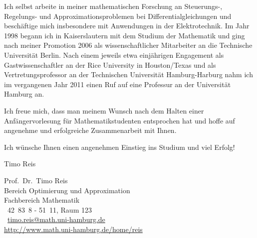 Ich selbst arbeite in meiner mathematischen Forschung an Steuerungs-,\linebreak
Regelungs- und Approximationsproblemen bei Differentialgleichungen und
besch\"aftige mich insbesondere mit Anwendungen in der Elektrotechnik. Im Jahr
1998 begann ich in Kaiserslautern mit dem Studium der Mathematik und ging nach
meiner Promotion 2006 als wissenschaftlicher Mitarbeiter an die Technische
Universit\"at Berlin. Nach einem jeweils etwa einj\"ahrigen Engagement als
Gastwissenschaftler an der Rice University in Houston/Texas und als
Vertretungsprofessor an der Technischen Universit\"at Hamburg-Harburg nahm ich
im vergangenen Jahr 2011 einen Ruf auf eine Professur an der Universit\"at
Hamburg an.

Ich freue mich, dass man meinem Wunsch nach dem Halten einer
Anf\"angervorlesung f\"ur Mathematikstudenten entsprochen hat und hoffe auf
angenehme und erfolgreiche Zusammenarbeit mit Ihnen.

Ich w\"unsche Ihnen einen angenehmen Einstieg ins Studium und viel Erfolg!

\bigskip

\hfill Timo Reis

Prof.~Dr.~Timo Reis\\
Bereich Optimierung und Approximation\\
Fachbereich Mathematik\\
\Telefon\ 42~83~8 - 51~11, Raum 123\\
\Letter\ \href{mailto:timo.reis@math.uni-hamburg.de}{timo.reis@math.uni-hamburg.de}\\
\url{http://www.math.uni-hamburg.de/home/reis}

